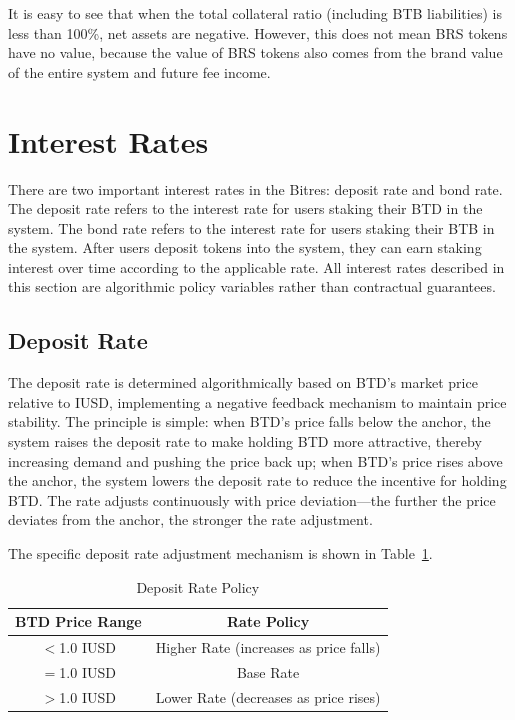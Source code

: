 \documentclass{article}
\begin{document}
It is easy to see that when the total collateral ratio (including BTB liabilities) is less than 100\%, net assets are negative. However, this does not mean BRS tokens have no value, because the value of BRS tokens also comes from the brand value of the entire system and future fee income.

\section{Interest Rates}

There are two important interest rates in the Bitres: deposit rate and bond rate. The deposit rate refers to the interest rate for users staking their BTD in the system. The bond rate refers to the interest rate for users staking their BTB in the system. After users deposit tokens into the system, they can earn staking interest over time according to the applicable rate. All interest rates described in this section are algorithmic policy variables rather than contractual guarantees.

\subsection{Deposit Rate}

The deposit rate is determined algorithmically based on BTD's market price relative to IUSD, implementing a negative feedback mechanism to maintain price stability. The principle is simple: when BTD's price falls below the anchor, the system raises the deposit rate to make holding BTD more attractive, thereby increasing demand and pushing the price back up; when BTD's price rises above the anchor, the system lowers the deposit rate to reduce the incentive for holding BTD. The rate adjusts continuously with price deviation---the further the price deviates from the anchor, the stronger the rate adjustment.

The specific deposit rate adjustment mechanism is shown in Table~\ref{tab:deposit-rate}.

\begin{table}[h]
\centering
\caption{Deposit Rate Policy}
\label{tab:deposit-rate}
\begin{tabular}{c|c}
\toprule
BTD Price Range & Rate Policy \\
\midrule
$<$1.0 IUSD & Higher Rate (increases as price falls) \\
$=$1.0 IUSD & Base Rate \\
$>$1.0 IUSD & Lower Rate (decreases as price rises) \\
\bottomrule
\end{tabular}
\end{table}
\end{document}
